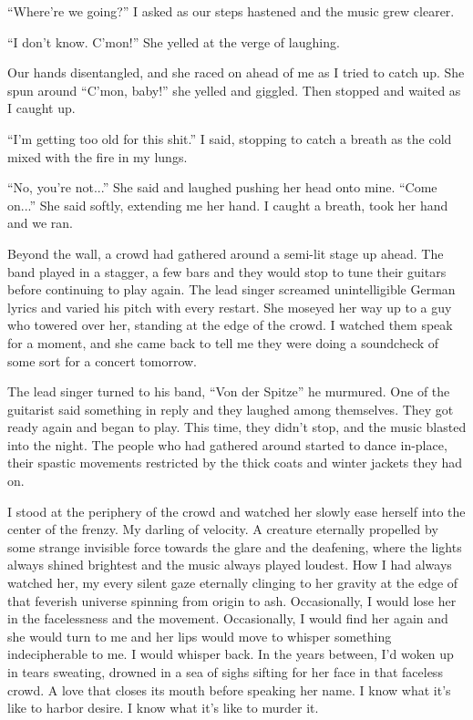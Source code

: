 \documentclass[11pt]{article}
\begin{document}
	``Where’re we going?'' I asked as our steps hastened and the music grew clearer.

	``I don’t know. C’mon!'' She yelled at the verge of laughing.

	Our hands disentangled, and she raced on ahead of me as I tried to catch up. She
spun around ``C’mon, baby!'' she yelled and giggled. Then stopped and waited as
I caught up.

	``I’m getting too old for this shit.'' I said, stopping to catch a breath as the
cold mixed with the fire in my lungs.

	``No, you’re not...'' She said and laughed pushing her head onto mine. ``Come
on...'' She said softly, extending me her hand. I caught a breath, took her hand
and we ran.

	Beyond the wall, a crowd had gathered around a semi-lit stage up ahead. The band
played in a stagger, a few bars and they would stop to tune their guitars before
continuing to play again. The lead singer screamed unintelligible German lyrics
and varied his pitch with every restart. She moseyed her way up to a guy who
towered over her, standing at the edge of the crowd. I watched them speak for a
moment, and she came back to tell me they were doing a soundcheck of some sort
for a concert tomorrow.

	The lead singer turned to his band, ``Von der Spitze'' he murmured. One of the
guitarist said something in reply and they laughed among themselves. They got
ready again and began to play. This time, they didn’t stop, and the music
blasted into the night. The people who had gathered around started to dance
in-place, their spastic movements restricted by the thick coats and winter
jackets they had on.

	I stood at the periphery of the crowd and watched her slowly ease herself into
the center of the frenzy. My darling of velocity. A creature eternally propelled
by some strange invisible force towards the glare and the deafening, where the
lights always shined brightest and the music always played loudest. How I had
always watched her, my every silent gaze eternally clinging to her gravity at
the edge of that feverish universe spinning from origin to ash. Occasionally, I
would lose her in the facelessness and the movement. Occasionally, I would find
her again and she would turn to me and her lips would move to whisper something
indecipherable to me. I would whisper back. In the years between, I’d woken up
in tears sweating, drowned in a sea of sighs sifting for her face in that
faceless crowd. A love that closes its mouth before speaking her name. I know
what it’s like to harbor desire. I know what it’s like to murder it.
\end{document}
